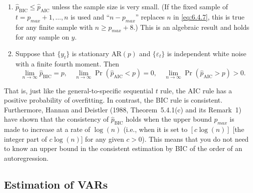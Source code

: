 \begin{enumerate}
\item[(1)] $\hat{p}_{\text{BIC}} \leq \hat{p}_{\text{AIC}}$ unless the sample size is very small. (If the fixed sample of
$t = p_{max} + 1, \ldots, n$ is used and ``$n - p_{max}$'' replaces $n$ in \eqref{eq:6.4.7}, this is true
for any finite sample with $n \geq p_{max} + 8$.) This is an algebraic result and holds
for any sample on $y$.

\item[(2)] Suppose that $\{y_t\}$ is stationary $\text{AR}(p)$ and $\{\varepsilon_t\}$ is independent white noise with
a finite fourth moment. Then
\begin{equation}
  \lim_{n \to \infty} \hat{p}_{\text{BIC}} = p, \quad
  \lim_{n \to \infty} \Pr(\hat{p}_{\text{AIC}} < p) = 0, \quad
  \lim_{n \to \infty} \Pr(\hat{p}_{\text{AIC}} > p) > 0.
  \label{eq:6.4.8}
\end{equation}
\end{enumerate}

That is, just like the general-to-specific sequential $t$ rule, the AIC rule has a positive
probability of overfitting. In contrast, the BIC rule is consistent. Furthermore,
Hannan and Deistler (1988, Theorem~5.4.1(c) and its Remark~1) have shown that
the consistency of $\hat{p}_{\text{BIC}}$ holds when the upper bound $p_{max}$ is made to increase at a
rate of $\log(n)$ (i.e., when it is set to $[c \log(n)]$ [the integer part of $c \log(n)$] for any
given $c > 0$). This means that you do not need to know an upper bound in the
consistent estimation by BIC of the order of an autoregression.

\subsection*{Estimation of VARs}

